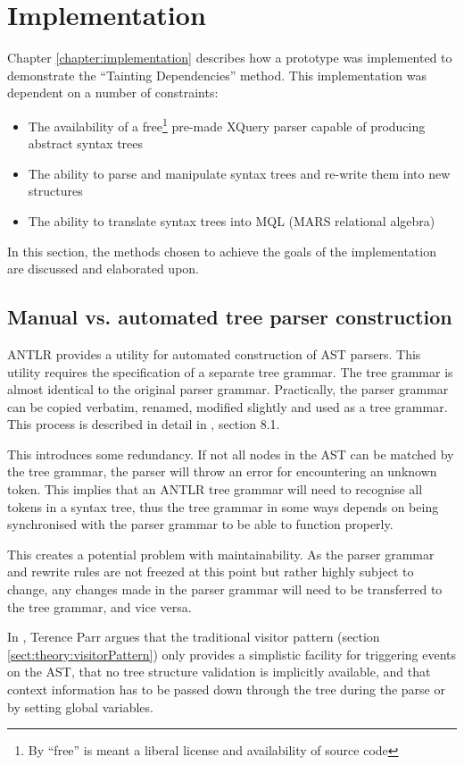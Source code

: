\section{Implementation}
\label{sect:disc:contextSens}
Chapter \ref{chapter:implementation} describes how a prototype was implemented
to demonstrate the ``Tainting Dependencies'' method. This implementation
was dependent on a number of constraints:
\begin{itemize}
  \item The availability of a free\footnote{By ``free'' is meant a liberal
  license and availability of source code} pre-made XQuery parser capable of
  producing abstract syntax trees
  \item The ability to parse and manipulate syntax trees and re-write them into
  new structures
  \item The ability to translate syntax trees into MQL (MARS relational algebra)
\end{itemize}

In this section, the methods chosen to achieve the goals of the implementation
are discussed and elaborated upon.

\subsection{Manual vs. automated tree parser construction}
ANTLR provides a utility for automated construction of AST parsers. This
utility requires the specification of a separate tree grammar. The tree
grammar is almost identical to the original parser grammar. Practically, the
parser grammar can be copied verbatim, renamed, modified slightly and used as
a tree  grammar. This process is described in detail in \cite{definitiveAntlr},
section 8.1.

This introduces some redundancy. If not all nodes in the AST can be matched by
the tree grammar, the parser will throw an error for encountering an unknown
token. This implies that an ANTLR tree grammar will need to recognise all tokens
in a syntax tree, thus the tree grammar in some ways depends on being
synchronised with the parser grammar to be able to function properly.

This creates a potential problem with maintainability. As the parser grammar and
rewrite rules are not freezed at this point but rather highly subject to
change, any changes made in the parser grammar will need to be transferred to
the tree grammar, and vice versa.

In \cite{translators_should_use_tree_grammars}, Terence Parr argues that the
traditional visitor pattern (section \ref{sect:theory:visitorPattern}) only
provides a simplistic facility for triggering events on the AST, that no tree
structure validation is implicitly available, and that context information has to be
passed down through the tree during the parse or by setting global variables.

